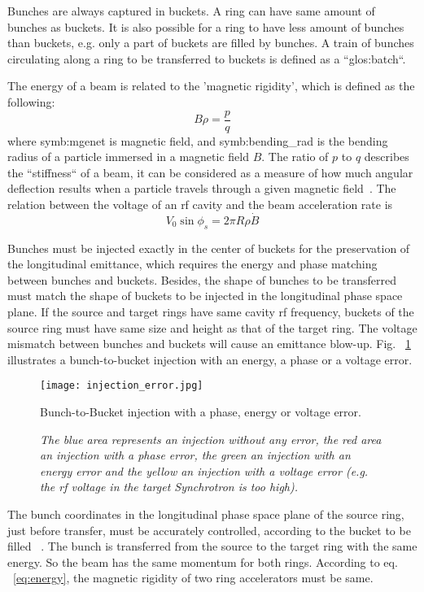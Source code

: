 Bunches are always captured in buckets. A ring can have same amount of bunches as buckets. It is also possible for a ring to have less amount of bunches than buckets, e.g. only a part of buckets are filled by bunches. A train of bunches circulating along a ring to be transferred to buckets is defined as a ``\gls{glos:batch}``.

The energy of a beam is related to the 'magnetic rigidity', which is defined as the following:
\begin{equation}
	\label{eq:energy}
	B\rho =\frac{p}{q}
\end{equation}
where \gls{symb:mgenet} is magnetic field, and \gls{symb:bending_rad} is the bending radius of a particle immersed in a magnetic field $B$. The ratio of $p$ to $q$ describes the ``stiffness`` of a beam, it can be considered as a measure of how much angular deflection results when a particle travels through a given magnetic field~\cite{barletta_lecture_nodate}. The relation between the voltage of an rf cavity and the beam acceleration rate is
\begin{equation}
	\label{eq:rf_acceleration}
	V_0\sin\phi_s=2\pi R\rho\dot{B}
\end{equation}

Bunches must be injected exactly in the center of buckets for the preservation of the longitudinal emittance, which requires the energy and phase matching between bunches and buckets. Besides, the shape of bunches to be transferred must match the shape of buckets to be injected in the longitudinal phase space plane. If the source and target rings have same cavity rf frequency, buckets of the source ring must have same size and height as that of the target ring. The voltage mismatch between bunches and buckets will cause an emittance blow-up. Fig. ~\ref{injection_error} illustrates a bunch-to-bucket injection with an energy, a phase or a voltage error. 
\begin{figure}[H]
   \centering   
   \texttt{[image: injection\_error.jpg]}
   \caption{Bunch-to-Bucket injection with a phase, energy or voltage error.}
	\caption*{\textsl{\small{The blue area represents an injection without any error, the red area an injection with a phase error, the green an injection with an energy error and the yellow an injection with a voltage error (e.g. the rf voltage in the target Synchrotron is too high).}}}
   \label{injection_error}
\end{figure} 

The bunch coordinates in the longitudinal phase space plane of the source ring, just before transfer, must be accurately controlled, according to the bucket to be filled ~\cite{garoby_cern-ps-rf-note-84-6_1984}. The bunch is transferred from the source to the target ring with the same energy. So the beam has the same momentum for both rings. According to eq. ~\ref{eq:energy}, the magnetic rigidity of two ring accelerators must be same.

